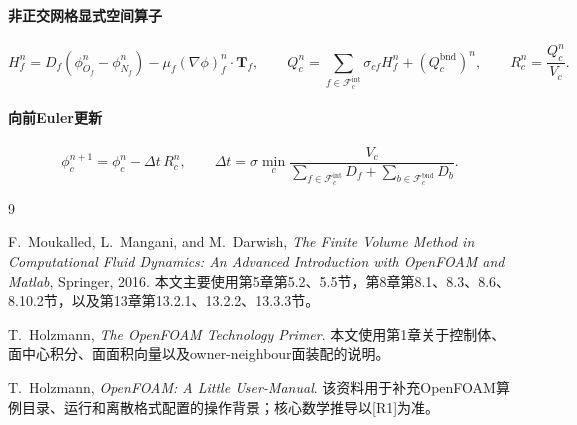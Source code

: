 \documentclass[UTF8,12pt,a4paper]{ctexart}
\numberwithin{equation}{section}
\newcommand{\Rone}{\textnormal{[R1]}}
\newcommand{\Tf}{\bm T}
\begin{document}
\paragraph{非正交网格显式空间算子}
\begin{equation}
  \boxed{
  H_f^n
  =D_f(\phi_{O_f}^n-\phi_{N_f}^n)
  -\mu_f(\nabla\phi)_f^n\cdot\Tf_f,
  \qquad
  Q_c^n
  =\sum_{f\in\mathcal F_c^{\mathrm{int}}}\sigma_{cf}H_f^n+(Q_c^{\mathrm{bnd}})^n,
  \qquad
  R_c^n=\frac{Q_c^n}{V_c}.}
  \label{eq:summary_space}
\end{equation}

\paragraph{向前Euler更新}
\begin{equation}
  \boxed{
  \phi_c^{n+1}
  =\phi_c^n-\Delta t\,R_c^n,
  \qquad
  \Delta t
  =\sigma\min_c
  \frac{V_c}{
  \sum_{f\in\mathcal F_c^{\mathrm{int}}}D_f
  +\sum_{b\in\mathcal F_c^{\mathrm{bnd}}}D_b}}.
  \label{eq:summary_update}
\end{equation}

\newpage
\begin{thebibliography}{9}

F.~Moukalled, L.~Mangani, and M.~Darwish,
\textit{The Finite Volume Method in Computational Fluid Dynamics: An Advanced Introduction with OpenFOAM and Matlab},
Springer, 2016.
本文主要使用第5章第5.2、5.5节，第8章第8.1、8.3、8.6、8.10.2节，以及第13章第13.2.1、13.2.2、13.3.3节。

T.~Holzmann,
\textit{The OpenFOAM Technology Primer}.
本文使用第1章关于控制体、面中心积分、面面积向量以及owner-neighbour面装配的说明。

T.~Holzmann,
\textit{OpenFOAM: A Little User-Manual}.
该资料用于补充OpenFOAM算例目录、运行和离散格式配置的操作背景；核心数学推导以\Rone 为准。

\end{thebibliography}
\end{document}
